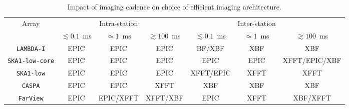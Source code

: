 \documentclass[
  journal=pasa,
  manuscript=article-type,
  year=2020,
  volume=37,
]{cup-journal}
\begin{document}
\begin{table}[htb!]
\normalsize
\begin{threeparttable}
\caption{Impact of imaging cadence on choice of efficient imaging architecture.}
\label{tab:cadence}
\begin{tabular}{c|ccc|ccc}
\toprule
\headrow 
Array & & Intra-station & & & Inter-station & \\
 & $\lesssim 0.1$~ms & $\simeq 1$~ms & $\gtrsim 100$~ms & $\lesssim 0.1$~ms & $\simeq 1$~ms & $\gtrsim 100$~ms \\ 
\midrule\midrule

\texttt{LAMBDA-I} & EPIC & EPIC & EPIC & BF/XBF & XBF & XBF \\
\midrule
\texttt{SKA1-low-core} & EPIC & EPIC & EPIC & EPIC & EPIC & XFFT/EPIC/XBF \\
\midrule
\texttt{SKA1-low} & EPIC & EPIC & EPIC & XFFT/EPIC & XFFT & XFFT \\
\midrule
\texttt{CASPA} & EPIC & EPIC & XFFT & XBF & XBF & XBF \\
\midrule
\texttt{FarView} & EPIC & EPIC/XFFT & XFFT/XBF & EPIC & XFFT & XBF/XFFT \\
\bottomrule
\end{tabular}
\end{threeparttable}
\end{table}



\end{document}
